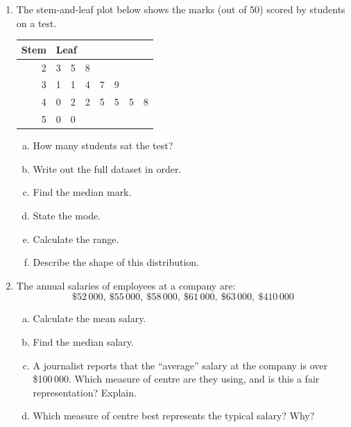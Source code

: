 \documentclass{article}
\begin{document}
\begin{enumerate}
  \item The stem-and-leaf plot below shows the marks (out of 50) scored by students on a test.
  \begin{center}
    \begin{tabular}{r|l}
      \textbf{Stem} & \textbf{Leaf} \\
      \hline
      2 & 3\ \ 5\ \ 8 \\
      3 & 1\ \ 1\ \ 4\ \ 7\ \ 9 \\
      4 & 0\ \ 2\ \ 2\ \ 5\ \ 5\ \ 5\ \ 8 \\
      5 & 0\ \ 0 \\
    \end{tabular}
  \end{center}
  \begin{enumerate}[(a)]
    \item How many students sat the test?
    \item Write out the full dataset in order.
    \item Find the median mark.
    \item State the mode.
    \item Calculate the range.
    \item Describe the shape of this distribution.
  \end{enumerate}

  \item The annual salaries of employees at a company are:
  \[
    \$52\,000,\ \$55\,000,\ \$58\,000,\ \$61\,000,\ \$63\,000,\ \$410\,000
  \]
  \begin{enumerate}[(a)]
    \item Calculate the mean salary.
    \item Find the median salary.
    \item A journalist reports that the ``average'' salary at the company is over \$100\,000. Which measure of centre are they using, and is this a fair representation? Explain.
    \item Which measure of centre best represents the typical salary? Why?
  \end{enumerate}


\end{enumerate}
\end{document}
